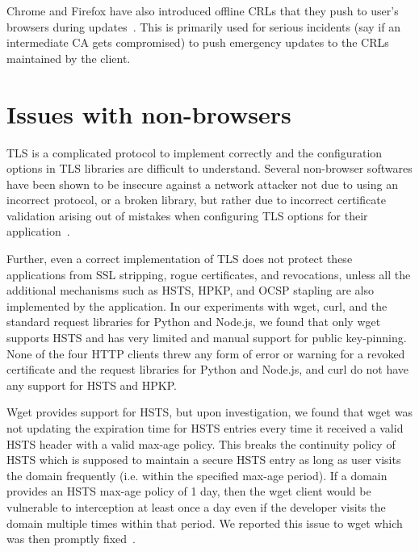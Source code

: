 Chrome and Firefox have also introduced offline CRLs that they push to user's
browsers during updates~\cite{onecrl, crlsets}. This is primarily used for
serious incidents (say if an intermediate CA gets compromised) to push
emergency updates to the CRLs maintained by the client.


\section{Issues with non-browsers}
\label{sec:problems-saber}

TLS is a complicated protocol to implement correctly and the configuration
options in TLS libraries are difficult to understand. Several non-browser
softwares have been shown to be insecure against a network attacker not due to
using an incorrect protocol, or a broken library, but rather due to incorrect
certificate validation arising out of mistakes when configuring TLS options for
their application~\cite{dangerous}.

Further, even a correct implementation of TLS does not protect these
applications from SSL stripping, rogue certificates, and revocations, unless
all the additional mechanisms such as HSTS, HPKP, and OCSP stapling are also
implemented by the application. In our experiments with wget, curl, and the
standard request libraries for Python and Node.js, we found that only wget
supports HSTS and has very limited and manual support for public key-pinning.
None of the four HTTP clients threw any form of error or warning for a revoked
certificate and the request libraries for Python and Node.js, and curl do not
have any support for HSTS and HPKP.

Wget provides support for HSTS, but upon investigation, we found that wget was
not updating the expiration time for HSTS entries every time it received a
valid HSTS header with a valid max-age policy. This breaks the continuity
policy of HSTS which is supposed to maintain a secure HSTS entry as long as
user visits the domain frequently (i.e. within the specified max-age period).
If a domain provides an HSTS max-age policy of 1 day, then the wget client
would be vulnerable to interception at least once a day even if the developer
visits the domain multiple times within that period. We reported this issue to
wget which was then promptly fixed~\cite{wgetbug}.

